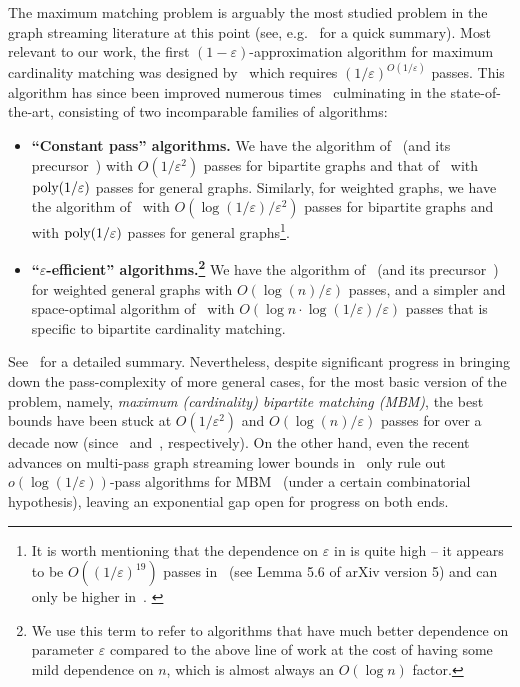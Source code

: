 \documentclass{theoretics}
\newcommand{\eps}{\varepsilon}
\newcommand{\poly}{\mbox{\rm poly}}
\begin{document}
The maximum matching problem is arguably the most studied problem in the graph streaming literature at this point (see, e.g.~\cite{AssadiS23} for a quick summary). 
Most relevant to our work, the first $(1-\eps)$-approximation algorithm for maximum cardinality matching
was designed by~\cite{McGregor05} which requires $(1/\eps)^{O(1/\eps)}$ passes. 
This algorithm has since been improved numerous times~\cite{EggertKS09,AhnG11,AhnG11b,EggertKMS12,Kapralov13,AhnG15,BehnezhadDETY17,Tirodkar18,GamlathKMS19,AssadiLT21,FischerMU22,AssadiJJST22,HuangS23} culminating in the state-of-the-art, consisting of two incomparable families of algorithms:  

\begin{itemize}[itemsep=5pt]
	\item \textbf{``Constant pass'' algorithms.} We have the algorithm of~\cite{AssadiLT21} (and its precursor~\cite{AhnG11}) with $O(1/\eps^2)$ passes for {bipartite} graphs and that of~\cite{FischerMU22} with $\poly{(1/\eps)}$ passes for general graphs. Similarly, for weighted graphs, 
	we have the algorithm of~\cite{AhnG11} with $O(\log{(1/\eps)}/\eps^2)$ passes for bipartite graphs and~\cite{HuangS23} with $\poly{(1/\eps)}$ passes for general graphs\footnote{It is worth mentioning that the dependence on
	$\eps$ in \cite{FischerMU22, HuangS23} is quite high -- it appears to be $O((1/\eps)^{19})$ passes in~\cite{FischerMU22} (see Lemma 5.6 of arXiv version 5) and can only be higher in~\cite{HuangS23}. \label{footnote:eps}}. 

	\item \textbf{``$\eps$-efficient'' algorithms.\footnote{We use this term to refer to algorithms that have  much better dependence on parameter $\eps$ compared to the above line of work at the cost of having some mild dependence on $n$, which
	is almost always an $O(\log{n})$ factor.}} We have the algorithm of~\cite{AhnG15} (and its precursor~\cite{AhnG11b}) for weighted general graphs with $O(\log{\!(n)}/\eps)$ passes, and a simpler and space-optimal algorithm of~\cite{AssadiJJST22}
	with $O(\log{n}\cdot\log{(1/\eps)}/\eps)$ passes that is specific to bipartite cardinality matching.  
\end{itemize}

See~ for a detailed summary. Nevertheless, despite significant progress in bringing down the pass-complexity of more general cases, for the most basic version of the problem, namely, \emph{maximum (cardinality) bipartite matching (MBM)}, 
the best bounds have been stuck at $O(1/\eps^2)$  and $O(\log{\!(n)}/\eps)$ passes for over a decade now (since~\cite{AhnG11} and~\cite{AhnG11b}, respectively). On the other hand, 
even the recent advances on multi-pass graph streaming lower bounds in~\cite{AssadiR20,ChenKPSSY21,Assadi22,AssadiS23,KonradN24} only rule out $o(\log{(1/\eps)})$-pass algorithms for MBM~\cite{AssadiS23} (under a certain combinatorial hypothesis), leaving an exponential gap open for progress on both ends. 
\end{document}
